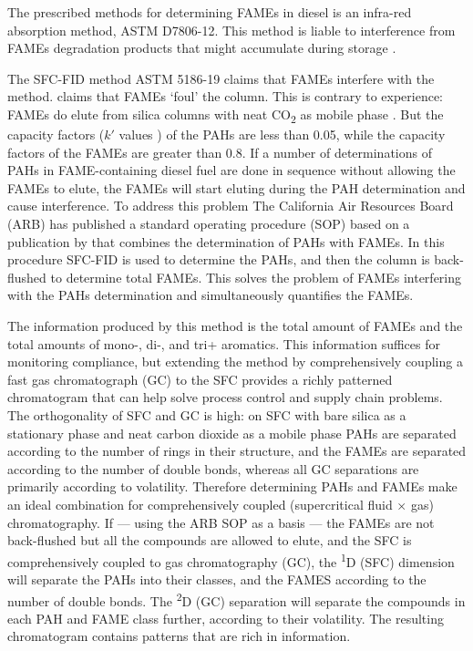 \documentclass[preprint,12pt]{elsarticle}
\begin{document}
The prescribed methods for determining FAMEs in diesel is an infra-red
absorption method, ASTM D7806-12. This method is liable to interference from FAMEs
degradation products that might accumulate during storage \citep{Pinho2014}.

The SFC-FID method ASTM 5186-19 claims that FAMEs interfere with the method.
\citet{Weber2016} claims that FAMEs `foul' the column. This is contrary to
experience: FAMEs do elute from silica columns with neat CO\textsubscript{2} as
mobile phase \citep{Smith2001}. But the capacity factors (\(k'\) values ) of the
PAHs are less than \num{0.05}, while the capacity factors of the FAMEs are
greater than \num{0.8}. If a number of
determinations of PAHs in FAME-containing diesel fuel are done in sequence
without allowing the FAMEs to elute, the FAMEs will start eluting during the PAH
determination and cause interference. To address this problem The California Air
Resources Board (ARB) has published a standard operating procedure (SOP)
\citep{ARB2017} based on a publication by \citet{Diehl2007} that combines the
determination of PAHs with FAMEs. In this procedure SFC-FID is used to determine
the PAHs, and then the column is back-flushed to determine total FAMEs. This
solves the problem of FAMEs interfering with the PAHs determination and
simultaneously quantifies the FAMEs.

The information produced by this method is the total amount of FAMEs and the
total amounts of mono-, di-, and tri+ aromatics. This information suffices for
monitoring compliance, but extending the method by comprehensively coupling a
fast gas chromatograph (GC) to the SFC provides a richly patterned chromatogram
that can help solve process control and supply chain problems. The orthogonality
of SFC and GC is high: on SFC with bare silica as a stationary phase and neat
carbon dioxide as a mobile phase PAHs are separated according to the number of
rings in their structure, and the FAMEs are separated according to the number of
double bonds, whereas all GC separations are primarily according to volatility.
Therefore determining PAHs and FAMEs make an ideal combination for
comprehensively coupled (supercritical fluid \(\times\) gas) chromatography.
If --- using the ARB SOP as a basis --- the FAMEs are not back-flushed but all
the compounds are allowed to elute,  and the SFC is comprehensively coupled to
gas chromatography (GC), the \textsuperscript{1}D (SFC) dimension will separate
the PAHs into their classes, and the FAMES according to the number of double
bonds. The \textsuperscript{2}D (GC) separation will separate the compounds in
each PAH and FAME class further, according to their volatility. The resulting
chromatogram contains patterns that are rich in information.
\end{document}
